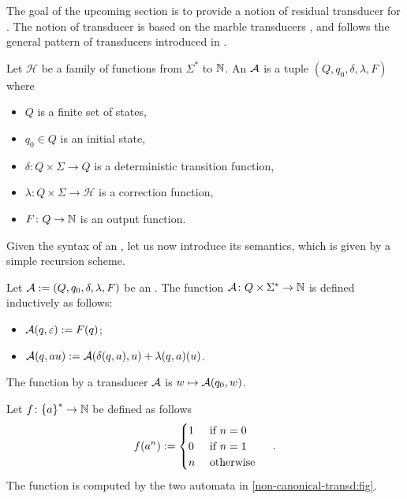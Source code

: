 The goal of the upcoming section is to provide a notion of residual transducer
for  . The notion of
transducer is based on the marble transducers \cite{EHB99}, and follows the
general pattern of transducers introduced in \cite{LOPEZ23b}.

\begin{definition}
    Let $\mathcal{H}$ be a family of functions
    from $\Sigma^*$ to $\mathbb{N}$.
    An  $\mathcal{A}$ is
    a tuple $(Q, q_0, \delta, \lambda, F)$ where
    \begin{itemize}
        \item $Q$ is a finite set of states,
        \item $q_0 \in Q$ is an initial state,
        \item $\delta \colon Q \times \Sigma \to Q$
            is a deterministic transition function,
        \item $\lambda \colon Q \times \Sigma \to \mathcal{H}$
            is a correction function,
        \item $F \colon Q \to \mathbb{N}$ is an output function.
    \end{itemize}
\end{definition}

Given the syntax of an , let us now 
introduce its semantics, which is given by a simple recursion
scheme.
\begin{definition}
    Let $\mathcal{A} \mathrel{:=} (Q,q_0, \delta, \lambda, F)$ be an .
    The function
    $\mathcal{A} \colon Q \times \Sigma^* \to \mathbb{N}$
    is defined inductively  as follows:
    \begin{itemize}
        \item $\mathcal{A}(q, \varepsilon) \mathrel{:=} F(q)$;
        \item $\mathcal{A}(q, a u) \mathrel{:=} \mathcal{A}(\delta(q,a), u)
            + \lambda(q,a)(u)$.
    \end{itemize}
    The function  by a transducer $\mathcal{A}$
    is $w \mapsto \mathcal{A}(q_0, w)$.
\end{definition}


\begin{example}
    \label{non-canonical-transd:ex}
    Let $f \colon \mathopen{\{} a \mathclose{\}}^* \to \mathbb{N}$
    be defined as follows
    \begin{equation*}
        f(a^n) \mathrel{:=}
        \begin{cases}
            1 & \text{ if } n = 0 \\
            0 & \text{ if } n = 1 \\
            n & \text{ otherwise }
        \end{cases}
        \quad .
    \end{equation*}
    The function is computed by the two automata
    in \cref{non-canonical-transd:fig}.
\end{example}


